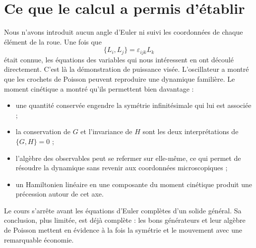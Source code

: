 \begin{classroomqa}
\end{classroomqa}

\begin{classroomqa}
\end{classroomqa}

\section{Ce que le calcul a permis d’établir}

Nous n’avons introduit aucun angle d’Euler ni suivi les coordonnées de chaque élément de la roue. Une fois que
\[
  \{L_i,L_j\}=\varepsilon_{ijk}L_k
\]
était connue, les équations des variables qui nous intéressent en ont découlé directement. C’est là la démonstration de puissance visée. L’oscillateur a montré que les crochets de Poisson peuvent reproduire une dynamique familière. Le moment cinétique a montré qu’ils permettent bien davantage :
\begin{itemize}
  \item une quantité conservée engendre la symétrie infinitésimale qui lui est associée ;
  \item la conservation de \(G\) et l’invariance de \(H\) sont les deux interprétations de \(\{G,H\}=0\) ;
  \item l’algèbre des observables peut se refermer sur elle-même, ce qui permet de résoudre la dynamique sans revenir aux coordonnées microscopiques ;
  \item un Hamiltonien linéaire en une composante du moment cinétique produit une précession autour de cet axe.
\end{itemize}
Le cours s’arrête avant les équations d’Euler complètes d’un solide général. Sa conclusion, plus limitée, est déjà complète : les bons générateurs et leur algèbre de Poisson mettent en évidence à la fois la symétrie et le mouvement avec une remarquable économie.
